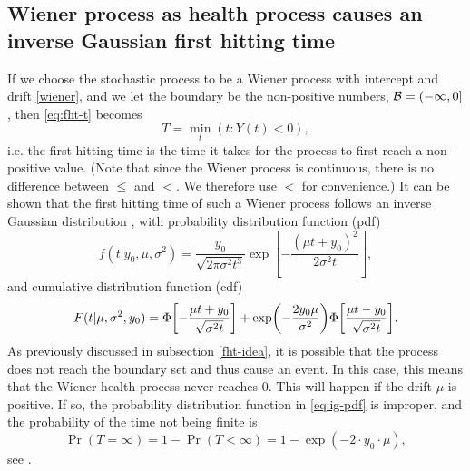 \subsection{Wiener process as health process causes an inverse Gaussian first hitting time}
If we choose the stochastic process to be a Wiener process with intercept and drift \eqref{wiener}, and we let the boundary be the non-positive numbers, $\mathcal{B}=(-\infty,0]$, then \eqref{eq:fht-t} becomes
\begin{equation*}
    T=\min_t\left(t\colon Y(t)<0\right),
\end{equation*}
i.e. the first hitting time is the time it takes for the process to first reach a non-positive value.
(Note that since the Wiener process is continuous, there is no difference between $\leq$ and $<$. We therefore use $<$ for convenience.)
It can be shown that the first hitting time of such a Wiener process follows an inverse Gaussian distribution \citep{chhikara1988}, with probability distribution function (pdf)
\begin{equation}
\label{eq:ig-pdf}
    f(t|y_0,\mu,\sigma^2)=\frac{y_0}{\sqrt{2\pi\sigma^2t^3}}\exp\left[-\frac{(\mu t+y_0)^2}{2\sigma^2t}\right],
\end{equation}
and cumulative distribution function (cdf)
\begin{equation}
\label{eq:ig-cdf}
    F(t|\mu,\sigma^2,y_0)=\Phi\sqb*{-\frac{\mu t+y_0}{\sqrt{\sigma^2t}}}+\exp\p*{-\frac{2y_0\mu}{\sigma^2}}\Phi\sqb*{\frac{\mu t-y_0}{\sqrt{\sigma^2t}}}.
\end{equation}
As previously discussed in subsection \ref{fht-idea}, it is possible that the process does not reach the boundary set and thus cause an event.
In this case, this means that the Wiener health process never reaches 0.
This will happen if the drift $\mu$ is positive.
If so, the probability distribution function in \eqref{eq:ig-pdf} is improper, and the probability of the time not being finite is
\begin{equation}\label{eq:P-inf-FHT}
    \Pr{(T=\infty)}=1-\Pr{(T<\infty)}=1-\exp{(-2\cdot y_0\cdot\mu)},
\end{equation}
see \citet{cox1965}.

